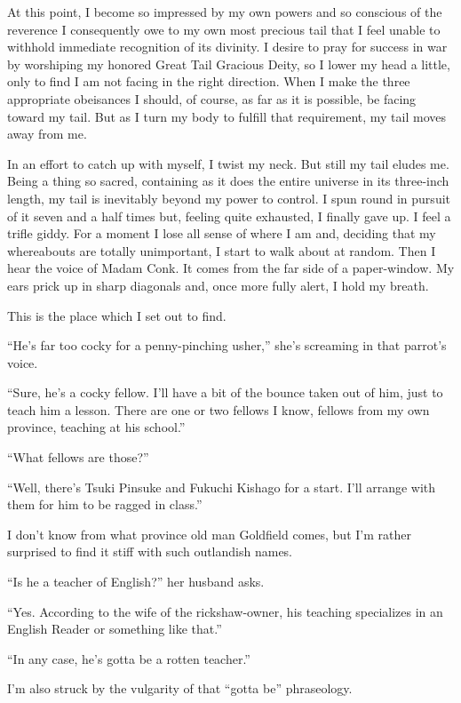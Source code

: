 \documentclass{book}
\begin{document}
At this point, I become so impressed by my own powers and so conscious
of the reverence I consequently owe to my own most precious tail that I
feel unable to withhold immediate recognition of its divinity. I desire
to pray for success in war by worshiping my honored Great Tail Gracious
Deity, so I lower my head a little, only to find I am not facing in the
right direction. When I make the three appropriate obeisances I should,
of course, as far as it is possible, be facing toward my tail. But as I
turn my body to fulfill that requirement, my tail moves away from me.

In an effort to catch up with myself, I twist my neck. But still my tail
eludes me. Being a thing so sacred, containing as it does the entire
universe in its three-inch length, my tail is inevitably beyond my power
to control. I spun round in pursuit of it seven and a half times but,
feeling quite exhausted, I finally gave up. I feel a trifle giddy. For a
moment I lose all sense of where I am and, deciding that my whereabouts
are totally unimportant, I start to walk about at random. Then I hear
the voice of Madam Conk. It comes from the far side of a paper-window.
My ears prick up in sharp diagonals and, once more fully alert, I hold
my breath.

This is the place which I set out to find.

``He's far too cocky for a penny-pinching usher,'' she's screaming in
that parrot's voice.

``Sure, he's a cocky fellow. I'll have a bit of the bounce taken out of
him, just to teach him a lesson. There are one or two fellows I know,
fellows from my own province, teaching at his school.''

``What fellows are those?''

``Well, there's Tsuki Pinsuke and Fukuchi Kishago for a start. I'll
arrange with them for him to be ragged in class.''

I don't know from what province old man Goldfield comes, but I'm rather
surprised to find it stiff with such outlandish names.

``Is he a teacher of English?'' her husband asks.

``Yes. According to the wife of the rickshaw-owner, his teaching
specializes in an English Reader or something like that.''

``In any case, he's gotta be a rotten teacher.''

I'm also struck by the vulgarity of that ``gotta be'' phraseology.
\end{document}
